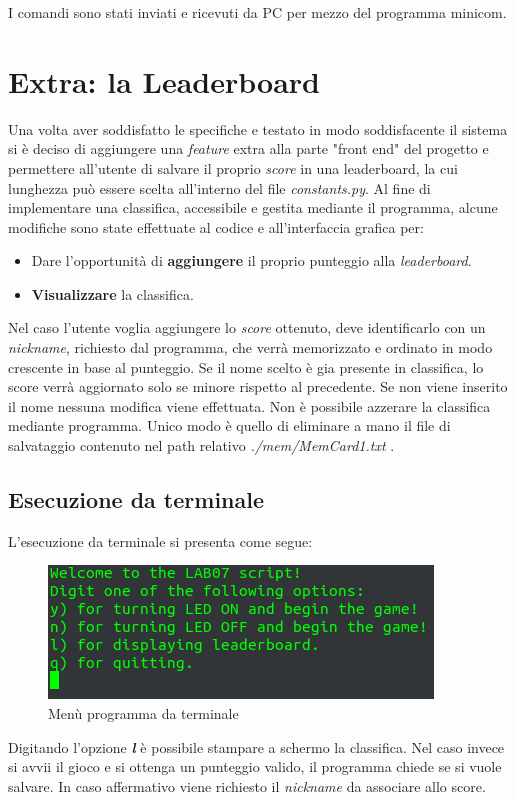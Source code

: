 \documentclass[a4paper]{article}
\begin{document}
		I comandi sono stati inviati e ricevuti da PC per mezzo del programma minicom.
\section{Extra: la Leaderboard}
		Una volta aver soddisfatto le specifiche e testato in modo soddisfacente il sistema si è deciso di aggiungere una \textit{feature} extra alla parte "front end" del progetto e permettere all'utente di salvare il proprio \textit{score} in una leaderboard, la cui lunghezza può essere scelta all'interno del file \textit{constants.py}. \newline
		Al fine di implementare una classifica, accessibile e gestita mediante il programma, alcune modifiche sono state effettuate al codice e all'interfaccia grafica per:
		\begin{itemize}
			\item Dare l'opportunità di \textbf{aggiungere} il proprio punteggio alla \textit{leaderboard}.
			\item \textbf{Visualizzare} la classifica.
		\end{itemize}
		Nel caso l'utente voglia aggiungere lo \textit{score} ottenuto, deve identificarlo con un \textit{nickname}, richiesto dal programma, che verrà memorizzato e ordinato in modo crescente in base al punteggio. Se il nome scelto è gia presente in classifica, lo score verrà aggiornato solo se minore rispetto al precedente. Se non viene inserito il nome nessuna modifica viene effettuata.\newline
		Non è possibile azzerare la classifica mediante programma. Unico modo è quello di eliminare a mano il file di salvataggio contenuto nel path relativo \textit{./mem/MemCard1.txt} .
	\subsection{Esecuzione da terminale}
		L'esecuzione da terminale si presenta come segue:

		\begin{figure}[H]
			\centering
			\includegraphics[scale=0.75]{img/terminal.png}
			\caption{Menù programma da terminale}
		\end{figure}
		Digitando l'opzione \textbf{\textit{l}} è possibile stampare a schermo la classifica.
		Nel caso invece si avvii il gioco e si ottenga un punteggio valido, il programma chiede se si vuole salvare. In caso affermativo viene richiesto il \textit{nickname} da associare allo score.
\end{document}
